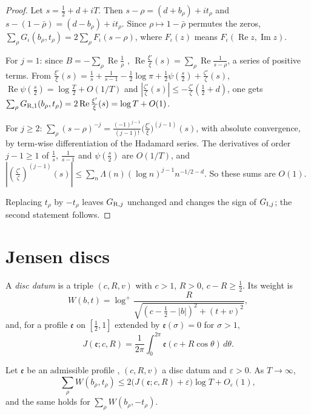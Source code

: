 \begin{proof}
Let $s=\frac12+d+iT$. Then $s-\rho=(d+b_\rho)+it_\rho$ and $s-(1-\bar\rho)=(d-b_\rho)+it_\rho$. Since $\rho\mapsto1-\bar\rho$ permutes the zeros, $\sum_\rho G_\iota(b_\rho,t_\rho)=2\sum_\rho F_\iota(s-\rho)$, where $F_\iota(z)$ means $F_\iota(\operatorname{Re}z,\operatorname{Im}z)$.

For $j=1$: since $B=-\sum_\rho\operatorname{Re}\frac1\rho$ \cite[Ch.~12]{Davenport2000}, $\operatorname{Re}\frac{\xi'}\xi(s)=\sum_\rho\operatorname{Re}\frac1{s-\rho}$, a series of positive terms. From $\frac{\xi'}\xi(s)=\frac1s+\frac1{s-1}-\frac12\log\pi+\frac12\psi(\frac s2)+\frac{\zeta'}\zeta(s)$, $\operatorname{Re}\psi(\frac s2)=\log\frac T2+O(1/T)$ \cite[5.11.2]{DLMF} and $|\frac{\zeta'}\zeta(s)|\le-\frac{\zeta'}\zeta(\frac12+d)$, one gets $\sum_\rho G_{{\rm R},1}(b_\rho,t_\rho)=2\operatorname{Re}\frac{\xi'}\xi(s)=\log T+O(1)$.

For $j\ge2$: $\sum_\rho(s-\rho)^{-j}=\frac{(-1)^{j-1}}{(j-1)!}\bigl(\frac{\xi'}\xi\bigr)^{(j-1)}(s)$, with absolute convergence, by term-wise differentiation of the Hadamard series. The derivatives of order $j-1\ge1$ of $\frac1s$, $\frac1{s-1}$ and $\psi(\frac s2)$ are $O(1/T)$, and $|(\frac{\zeta'}\zeta)^{(j-1)}(s)|\le\sum_n\Lambda(n)(\log n)^{j-1}n^{-1/2-d}$. So these sums are $O(1)$.

Replacing $t_\rho$ by $-t_\rho$ leaves $G_{{\rm R},j}$ unchanged and changes the sign of $G_{{\rm I},j}$; the second statement follows.
\end{proof}

\section{Jensen discs}\label{sec:jensen}

A \emph{disc datum} is a triple $(c,R,v)$ with $c>1$, $R>0$, $c-R\ge\frac12$. Its weight is
\begin{equation}
W(b,t)=\log^+\frac R{\sqrt{(c-\frac12-|b|)^2+(t+v)^2}},
\label{eq:W_def}
\end{equation}
and, for a profile $\mathfrak e$ on $[\frac12,1]$ extended by $\mathfrak e(\sigma)=0$ for $\sigma>1$,
\begin{equation}
J(\mathfrak e;c,R)=\frac1{2\pi}\int_0^{2\pi}\mathfrak e(c+R\cos\theta)\,d\theta .
\label{eq:J_def}
\end{equation}

\begin{lemma}\label{lem:jensen}
Let $\mathfrak e$ be an admissible profile \cite[(1.3)]{CasanaGiner2026}, $(c,R,v)$ a disc datum and $\varepsilon>0$. As $T\to\infty$,
\[
\sum_\rho W(b_\rho,t_\rho)\le2\bigl(J(\mathfrak e;c,R)+\varepsilon\bigr)\log T+O_\varepsilon(1),
\]
and the same holds for $\sum_\rho W(b_\rho,-t_\rho)$.
\end{lemma}

